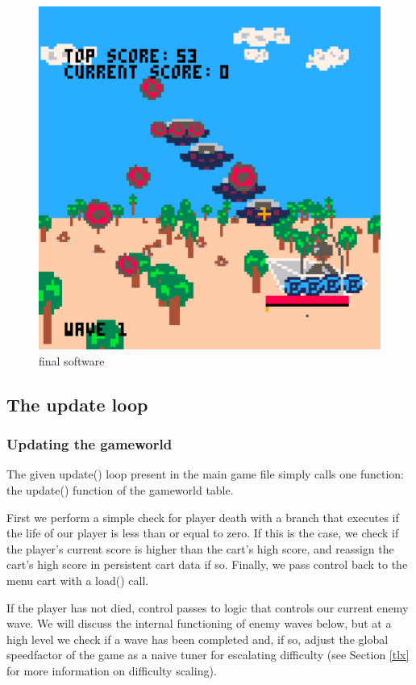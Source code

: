 \documentclass[11pt]{article}
\begin{document}
\begin{figure}[h]
    \centering
    \includegraphics[width=.8\textwidth]{final3d}
    \caption{final software}
    \label{fig:3dfinal}
\end{figure}

\subsection{The update loop}

\subsubsection*{Updating the gameworld}
The given \textunderscore update() loop present in the main game file simply calls one
function: the update() function of the game\textunderscore world table.

First we perform a simple check for player death with a branch that executes if the
life of our player is less than or equal to zero. If this is the case, we check if
the player's current score is higher than the cart's high score, and reassign the
cart's high score in persistent cart data if so. Finally, we pass control back to
the menu cart with a load() call.

If the player has not died, control passes to logic that controls our current enemy
wave. We will discuss the internal functioning of enemy waves below, but at a high level
we check if a wave has been completed and, if so, adjust the global
speed\textunderscore factor of the game as a naive tuner for escalating difficulty
(see Section \ref{tlx} for more information on difficulty scaling).
\end{document}
